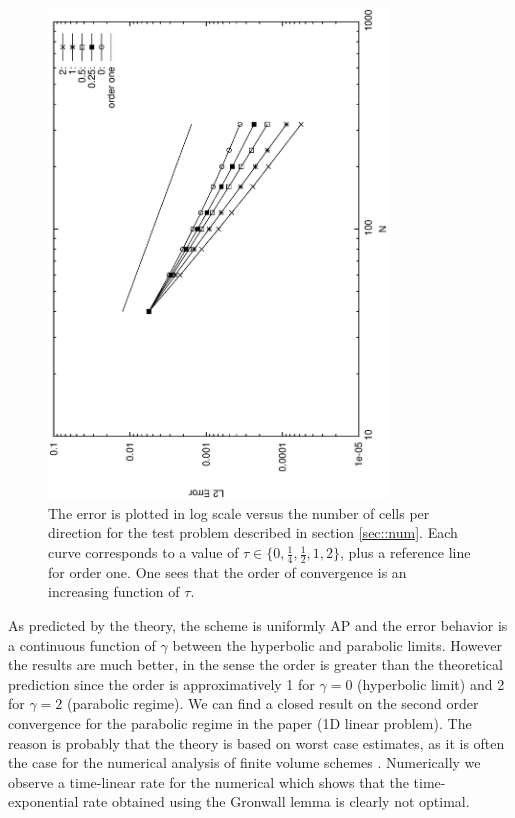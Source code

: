 \documentclass[a4paper,french,english,10pt]{article}
\begin{document}
\begin{figure}
\begin{center}
\includegraphics[width=9cm,angle=-90]{sortie_enfin.eps}
\end{center}
\caption{The error is plotted in log scale versus the number of cells per direction for the test problem described
in section \ref{sec::num}.
Each curve corresponds to a value of $\tau\in\{0,\frac14, \frac12, 1, 2  \}$, plus 
a reference line for order one. One sees that the order of convergence is an increasing function
of $\tau$.}
\label{fig1}
\end{figure}

As predicted by  the theory, the scheme is uniformly AP and the error behavior is a continuous function of $\gamma$
between the  hyperbolic and parabolic limits. However the results are much better, in the sense
the order is greater than the theoretical prediction since
the order is approximatively 1 for $\gamma=0$ (hyperbolic limit)
and 2 for $\gamma=2$ (parabolic regime).  We can find a closed result on the second order convergence for the parabolic regime in the paper \cite{TAHO} (1D linear problem).
The reason is probably that the theory is based on worst case estimates, as it is often the case for the numerical analysis
of finite volume schemes \cite{FV}. Numerically we observe a time-linear rate for the numerical which shows that the time-exponential rate obtained using the Gronwall lemma is clearly not optimal.
\end{document}
